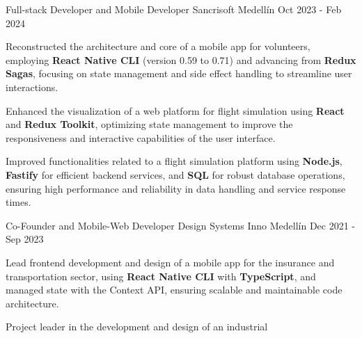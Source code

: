\newcommand{\quotes}[1]{``#1''}

\begin{cventries}

\cventry
{Full-stack Developer and Mobile Developer} %
{Sancrisoft} %
{Medellín} %
{Oct 2023 - Feb 2024} %
{
  \begin{cvitems} %
    \item {Reconstructed the architecture and core of a mobile app for
    volunteers, employing \textbf{React Native CLI} (version 0.59 to 0.71)
    and advancing from \textbf{Redux Sagas}, focusing on state
    management and side effect handling to streamline user
    interactions.}
    \item {Enhanced the visualization of a web platform for flight
    simulation using \textbf{React} and \textbf{Redux Toolkit}, optimizing state
    management to improve the responsiveness and interactive
    capabilities of the user interface.}
    \item {Improved functionalities related to a flight simulation platform
    using \textbf{Node.js}, \textbf{Fastify} for efficient backend services, and \textbf{SQL}
    for robust database operations, ensuring high performance
    and reliability in data handling and service response times.}
  \end{cvitems}
}
\cventry
{Co-Founder and Mobile-Web Developer} %
{Design Systems Inno} %
{Medellín} %
{Dec 2021 - Sep 2023} %
{
  \begin{cvitems} %
    \item {Lead frontend development and design of a mobile app for
    the insurance and transportation sector, using \textbf{React Native CLI} with
    \textbf{TypeScript}, and managed state with the Context API,
    ensuring scalable and maintainable code architecture.}
    \item {Project leader in the development and design of an industrial
}
\end{cvitems}}
\end{cventries}

